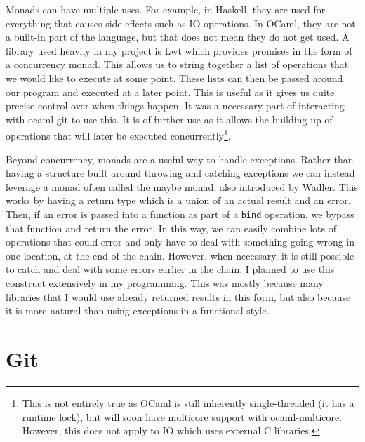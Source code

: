 Monads can have multiple uses. For example, in Haskell, they are used for everything that causes side effects such as IO operations. In OCaml, they are not a built-in part of the language, but that does not mean they do not get used. A library used heavily in my project is Lwt\cite{code_lwt} which provides promises\cite{Liskov1988} in the form of a concurrency monad. This allows us to string together a list of operations that we would like to execute at some point. These lists can then be passed around our program and executed at a later point. This is useful as it gives us quite precise control over when things happen. It was a necessary part of interacting with ocaml-git to use this. It is of further use as it allows the building up of operations that will later be executed concurrently\footnote{This is not entirely true as OCaml is still inherently single-threaded (it has a runtime lock), but will soon have multicore support with ocaml-multicore\cite{dolan2014multicore}. However, this does not apply to IO which uses external C libraries.}.

Beyond concurrency, monads are a useful way to handle exceptions. Rather than having a structure built around throwing and catching exceptions we can instead leverage a monad often called the maybe monad, also introduced by Wadler\cite{wadler90monads}. This works by having a return type which is a union of an actual result and an error. Then, if an error is passed into a function as part of a \texttt{bind} operation, we bypass that function and return the error. In this way, we can easily combine lots of operations that could error and only have to deal with something going wrong in one location, at the end of the chain. However, when necessary, it is still possible to catch and deal with some errors earlier in the chain. I planned to use this construct extensively in my programming. This was mostly because many libraries that I would use already returned results in this form, but also because it is more natural than using exceptions in a functional style.

\section{Git} \label{section:git}

